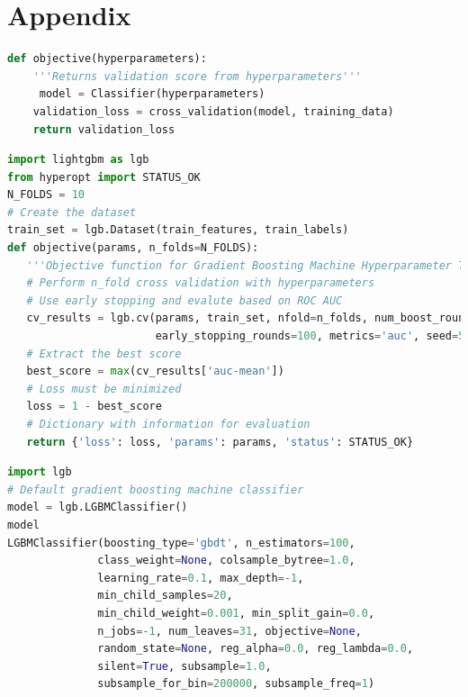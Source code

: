\documentclass{apmcmthesis}
\begin{document}
\newpage

\section{Appendix}
\begin{lstlisting}[language=python,caption={the python objective function definition}]
def objective(hyperparameters):
    '''Returns validation score from hyperparameters'''
     model = Classifier(hyperparameters)
    validation_loss = cross_validation(model, training_data)
    return validation_loss

 \end{lstlisting}
\begin{lstlisting}[language=python,caption={Use 10\% off cross validation and early stop}]
import lightgbm as lgb
from hyperopt import STATUS_OK
N_FOLDS = 10
# Create the dataset
train_set = lgb.Dataset(train_features, train_labels)
def objective(params, n_folds=N_FOLDS):
   '''Objective function for Gradient Boosting Machine Hyperparameter Tuning'''
   # Perform n_fold cross validation with hyperparameters
   # Use early stopping and evalute based on ROC AUC
   cv_results = lgb.cv(params, train_set, nfold=n_folds, num_boost_round=10000,
                       early_stopping_rounds=100, metrics='auc', seed=50)
   # Extract the best score
   best_score = max(cv_results['auc-mean'])
   # Loss must be minimized
   loss = 1 - best_score
   # Dictionary with information for evaluation
   return {'loss': loss, 'params': params, 'status': STATUS_OK}
 \end{lstlisting}
\begin{lstlisting}[language=python,caption={All superparameters in GBM}]
import lgb
# Default gradient boosting machine classifier
model = lgb.LGBMClassifier()
model
LGBMClassifier(boosting_type='gbdt', n_estimators=100,
              class_weight=None, colsample_bytree=1.0,
              learning_rate=0.1, max_depth=-1,
              min_child_samples=20,
              min_child_weight=0.001, min_split_gain=0.0,
              n_jobs=-1, num_leaves=31, objective=None,
              random_state=None, reg_alpha=0.0, reg_lambda=0.0,
              silent=True, subsample=1.0,
              subsample_for_bin=200000, subsample_freq=1)
 \end{lstlisting}
\end{document}
